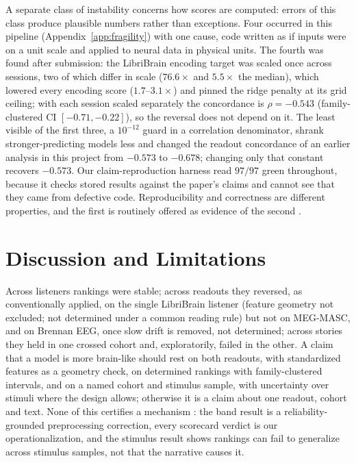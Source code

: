 \documentclass{article}
\begin{document}
A separate class of instability concerns how scores are computed: errors of this class produce
plausible numbers rather than exceptions. Four
occurred in this pipeline (Appendix~\ref{app:fragility}) with one cause, code written as if inputs were on a unit scale and
applied to neural data in physical units. The fourth was found after submission: the LibriBrain
encoding target was scaled once across sessions, two of which differ in scale ($76.6\times$ and
$5.5\times$ the median), which lowered every encoding score ($1.7$--$3.1\times$) and pinned the ridge penalty at its
grid ceiling; with each session scaled separately the concordance is $\rho=-0.543$ (family-clustered
CI $[-0.71, -0.22]$), so the reversal does not depend on it. The least visible of the first three, a $10^{-12}$ guard in a correlation
denominator, shrank stronger-predicting models less and changed the readout concordance of an
earlier analysis in this project from $-0.573$ to $-0.678$; changing only that constant recovers
$-0.573$. Our claim-reproduction harness read $97/97$ green throughout, because it checks stored
results against the paper's claims and cannot see that they came from defective code.
Reproducibility and correctness are different properties, and the first is routinely offered as
evidence of the second \citep{eklund2016cluster, botviniknezer2020variability}.


\section{Discussion and Limitations}\label{discussion}\label{limitations}

Across listeners rankings were stable; across readouts they reversed, as conventionally applied,
on the single LibriBrain listener (feature geometry not excluded; not determined under a common
reading rule) but not on MEG-MASC, and on Brennan EEG, once slow drift is removed, not determined;
across stories they held in one crossed cohort and, exploratorily, failed in the other. A claim that
a model is more brain-like should rest on both readouts, with standardized features as a geometry
check, on determined rankings with family-clustered intervals, and on a named cohort and stimulus sample, with
uncertainty over stimuli where the design allows; otherwise it is a claim about one readout, cohort
and text. None of this certifies a
mechanism \citep{murphy2026country}: the band result is a reliability-grounded preprocessing
correction, every scorecard verdict is our operationalization, and the stimulus result shows
rankings can fail to generalize across stimulus samples, not that the narrative causes it.
\end{document}
